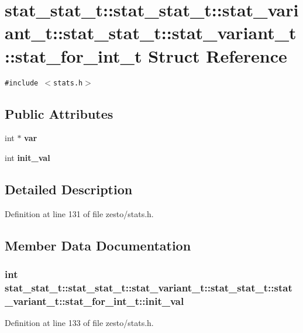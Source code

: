 \section{stat\_\-stat\_\-t::stat\_\-stat\_\-t::stat\_\-variant\_\-t::stat\_\-stat\_\-t::stat\_\-variant\_\-t::stat\_\-for\_\-int\_\-t Struct Reference}
\label{structstat__stat__t_1_1stat__variant__t_1_1stat__for__int__t}
{\tt \#include $<$stats.h$>$}

\subsection*{Public Attributes}
\begin{CompactItemize}
\item 
int $\ast$ {\bf var}
\item 
int {\bf init\_\-val}
\end{CompactItemize}


\subsection{Detailed Description}


Definition at line 131 of file zesto/stats.h.

\subsection{Member Data Documentation}
\subsubsection[{init\_\-val}]{\setlength{\rightskip}{0pt plus 5cm}int stat\_\-stat\_\-t::stat\_\-stat\_\-t::stat\_\-variant\_\-t::stat\_\-stat\_\-t::stat\_\-variant\_\-t::stat\_\-for\_\-int\_\-t::init\_\-val}\label{structstat__stat__t_1_1stat__variant__t_1_1stat__for__int__t_f198acf7ec0e621ea74ce7059911c444}




Definition at line 133 of file zesto/stats.h.
